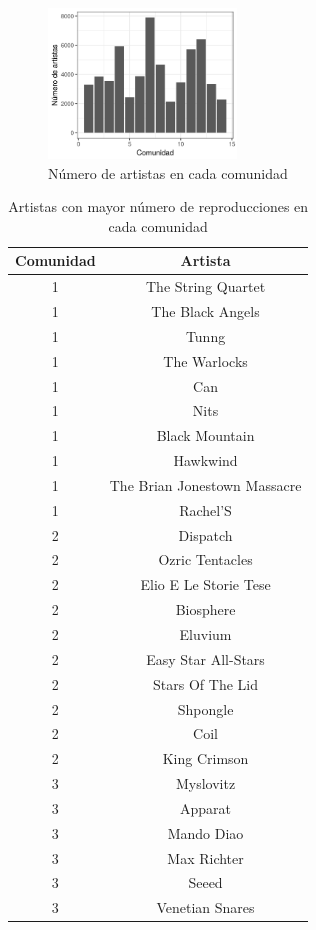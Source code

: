 \documentclass[conference]{IEEEtran}
\begin{document}
\begin{figure}[h]
    \centering
    \label{fig:numero_artistas_comunidad}
    \caption{Número de artistas en cada comunidad}
    \includegraphics[width=5cm]{artistas_por_comunidad.png}
\end{figure}
\begin{table}[]
\label{table:artistas_representantes_comunidad}
\caption{Artistas con mayor número de reproducciones en cada comunidad}
\centering
\begin{tabular}{|c|c|}
  \hline
 Comunidad & Artista \\ 
  \hline
1 & The String Quartet \\ 
1 & The Black Angels \\ 
1 & Tunng \\ 
1 & The Warlocks \\ 
1 & Can \\ 
1 & Nits \\ 
1 & Black Mountain \\ 
1 & Hawkwind \\ 
1 & The Brian Jonestown Massacre \\ 
1 & Rachel'S \\ \hline
2 & Dispatch \\ 
2 & Ozric Tentacles \\ 
2 & Elio E Le Storie Tese \\ 
2 & Biosphere \\ 
2 & Eluvium \\ 
2 & Easy Star All-Stars \\ 
2 & Stars Of The Lid \\ 
2 & Shpongle \\ 
2 & Coil \\ 
2 & King Crimson \\   \hline
3 & Myslovitz \\ 
3 & Apparat \\ 
3 & Mando Diao \\ 
3 & Max Richter \\ 
3 & Seeed \\ 
3 & Venetian Snares \\ 

\end{tabular}
\end{table}
\end{document}
